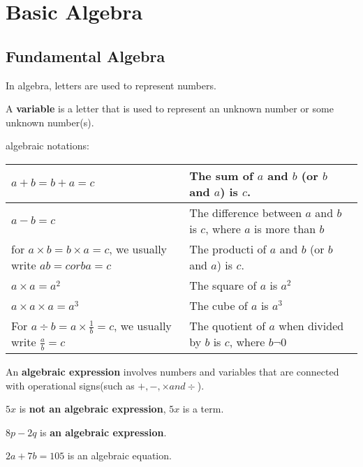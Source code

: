 \documentclass[../main]{subfiles}
\begin{document}
\section{Basic Algebra}

\subsection{Fundamental Algebra}
In algebra, letters are used to represent numbers.

A \textbf{variable} is a letter that is used to represent an unknown number or
some unknown number(s).

algebraic notations:

\begin{center}
  \begin{tabular}{| p{4cm} | p{4cm} |}
    \hline
    
    \(a + b = b + a =c \) & The sum of $a$ and $b$ (or $b$ and $a$) is $c$. \\
    \hline
    \(a-b=c\) & The difference between $a$ and $b$ is $c$, where $a$ is more than $b$ \\
    \hline
    for \(a\times b = b \times a = c\), we usually write \(ab=c or ba=c\) & The producti of $a$ and $b$ (or $b$ and $a$) is $c$. \\
    \hline
    \(a \times a = a^2\) & The square of $a$ is $a^2$ \\
    \hline
    \(a \times a \times a= a^3\) & The cube of $a$ is $a^3$ \\
    \hline
    For \(a \div b = a \times {\frac 1 b} = c\), we usually write \({\frac a b}=c\) & The quotient of $a$ when divided by $b$ is $c$, where
                                                                                      \(b \neg 0\) \\
    \hline                                                                                      
    
  \end{tabular}
\end{center}

An \textbf{algebraic expression} involves numbers and variables that are
connected with operational signs(such as \(+, -, \times and \div\)).

\(5x\) is \textbf{not an algebraic expression}, \(5x\) is a term.

\(8p - 2q\) is \textbf{an algebraic expression}.

\(2a +7b = 105\) is an algebraic equation.
\end{document}
